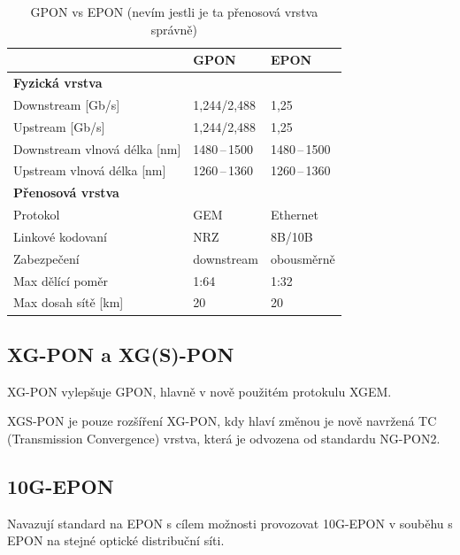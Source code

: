 \begin{table}[ht]
    \centering
    \caption{GPON vs EPON (nevím jestli je ta přenosová vrstva správně)}
    \begin{tabular}{|l|l|l|}
        \hline
                                     & GPON           & EPON           \\\hline\hline
        \textbf{Fyzická vrstva}      &                &                \\\hline\hline
        Downstream [Gb/s]            & 1,244/2,488    & 1,25           \\\hline
        Upstream [Gb/s]              & 1,244/2,488    & 1,25           \\\hline
        Downstream vlnová délka [nm] & 1480\,--\,1500 & 1480\,--\,1500 \\\hline
        Upstream vlnová délka [nm]   & 1260\,--\,1360 & 1260\,--\,1360 \\\hline\hline
        \textbf{Přenosová vrstva}    &                &                \\\hline\hline
        Protokol                     & GEM            & Ethernet       \\\hline
        Linkové kodovaní             & NRZ            & 8B/10B         \\\hline
        Zabezpečení                  & downstream     & obousměrně     \\\hline
        Max dělící poměr             & 1:64           & 1:32           \\\hline
        Max dosah sítě [km]          & 20             & 20             \\\hline
    \end{tabular}
\end{table}

\subsection{XG-PON a XG(S)-PON}

XG-PON vylepšuje GPON, hlavně v nově použitém protokulu XGEM.

XGS-PON je pouze rozšíření XG-PON, kdy hlaví změnou je nově navržená TC (Transmission Convergence) vrstva, která je odvozena od standardu NG-PON2.

\subsection{10G-EPON}

Navazují standard na EPON s cílem možnosti provozovat 10G-EPON v souběhu s EPON na stejné optické distribuční síti.

